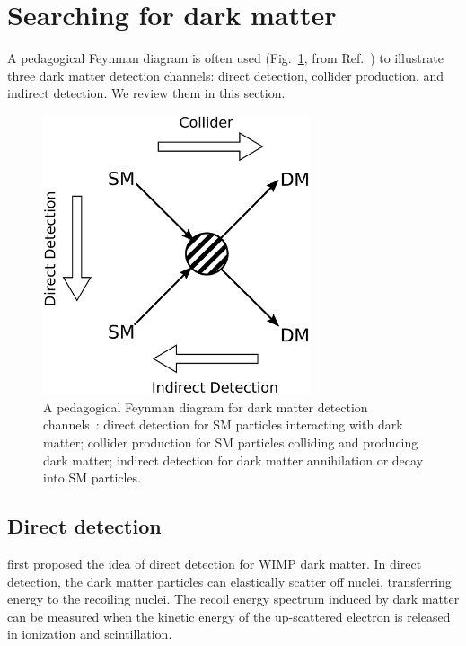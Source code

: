 \documentclass[doublespace,nopageskip]{VTthesis} %
\begin{document}
\section{Searching for dark matter}

A pedagogical Feynman diagram is often used (Fig.~\ref{fig:dm_search}, from Ref.~\cite{2019FrP.....7...75G}) to illustrate three dark matter detection channels: direct detection, collider production, and indirect detection. We review them in this section.

\begin{figure}[htb]
    \centering
    \includegraphics[width=0.7\textwidth]{Figures/Intro/dm_diagram.jpg}
    \caption{A pedagogical Feynman diagram for dark matter detection channels~\cite{2019FrP.....7...75G}: direct detection for SM particles interacting with dark matter; collider production for SM particles colliding and producing dark matter; indirect detection for dark matter annihilation or decay into SM particles.}
    \label{fig:dm_search}
\end{figure}

\subsection{Direct detection}

\citet{1985PhRvD..31.3059G} first proposed the idea of direct detection for WIMP dark matter. In direct detection, the dark matter particles can elastically scatter off nuclei, transferring energy to the recoiling nuclei. The recoil energy spectrum induced by dark matter can be measured when the kinetic energy of the up-scattered electron is released in ionization and scintillation. 
\end{document}
